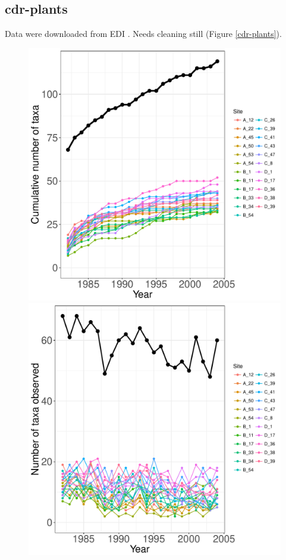 \documentclass[11pt, oneside]{article}
\begin{document}
\subsection {cdr-plants}
Data were downloaded from EDI \citep{cdr-plants}.
Needs cleaning still (Figure \ref{cdr-plants}).

\begin{figure}[h!]
\centering
\includegraphics[scale = 0.4]{cdr-plants-compagnoni_species_accumulation_curve.pdf}
\includegraphics[scale = 0.4]{cdr-plants-compagnoni_num_taxa_over_time.pdf}

\end{figure}
\end{document}
